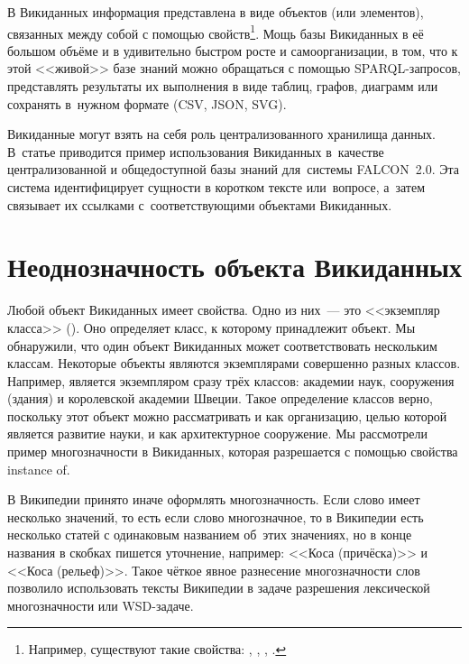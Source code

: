 В Викиданных информация представлена в виде объектов (или элементов), 
связанных между собой с помощью свойств\footnote{%
%
Например, существуют такие свойства: , 
, \mbox{}, .%
%
}. Мощь базы Викиданных в её большом объёме и в удивительно быстром росте и самоорганизации, 
в том, что к этой <<живой>> базе знаний можно обращаться с помощью  SPARQL-запросов, 
представлять результаты их выполнения в виде таблиц, графов, диаграмм или сохранять в~нужном формате (CSV, JSON, SVG).

Викиданные могут взять на себя роль централизованного хранилища данных. 
В~статье\autocite{Falcon} приводится пример использования Викиданных 
в~качестве централизованной и общедоступной базы знаний для~системы FALCON~2.0. 
Эта система идентифицирует сущности в коротком тексте или~вопросе, 
а~затем связывает их ссылками с~соответствующими объектами Викиданных.



\section{Неоднозначность объекта Викиданных}

Любой объект Викиданных имеет свойства. Одно из них~--- это <<экземпляр класса>> 
(). Оно определяет класс, к которому принадлежит объект. 
Мы обнаружили, что один объект Викиданных может соответствовать нескольким классам.
Некоторые объекты являются экземплярами совершенно разных классов. 
Например,  является экземпляром 
сразу трёх классов: академии наук, сооружения (здания) и королевской академии Швеции. 
Такое определение классов верно, поскольку этот объект можно рассматривать 
и как организацию, целью которой является развитие науки, и как архитектурное сооружение. 
Мы рассмотрели пример многозначности в Викиданных, которая разрешается с помощью свойства instance of.

В Википедии принято иначе оформлять многозначность. 
Если слово имеет несколько значений, то есть если слово многозначное, 
то в Википедии есть несколько статей с одинаковым названием об~этих значениях, 
но в конце названия в скобках пишется уточнение, 
например: <<Коса (причёска)>> и <<Коса (рельеф)>>. 
Такое чёткое явное разнесение многозначности слов позволило использовать тексты Википедии 
в задаче разрешения лексической многозначности или WSD-задаче\autocite{Fogarolli}.




